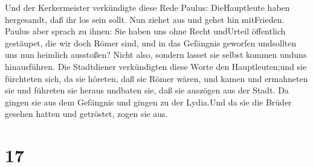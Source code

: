  Und der Kerkermeister verkündigte diese Rede Paulus:
DieHauptleute haben hergesandt, daß ihr los sein sollt. Nun ziehet aus
und gehet hin mitFrieden.  Paulus aber sprach zu ihnen: Sie
haben uns ohne Recht undUrteil öffentlich gestäupet, die wir doch Römer
sind, und in das Gefängnis geworfen undsollten uns nun heimlich
ausstoßen? Nicht also, sondern lasset sie selbst kommen unduns
hinausführen.  Die Stadtdiener verkündigten diese Worte den
Hauptleuten;und sie fürchteten sich, da sie höreten, daß sie Römer
wären,  und kamen und ermahneten sie und führeten sie
heraus undbaten sie, daß sie auszögen aus der Stadt.  Da
gingen sie aus dem Gefängnis und gingen zu der Lydia.Und da sie die
Brüder gesehen hatten und getröstet, zogen sie aus.

\hypertarget{section-16}{%
\section{17}\label{section-16}}

